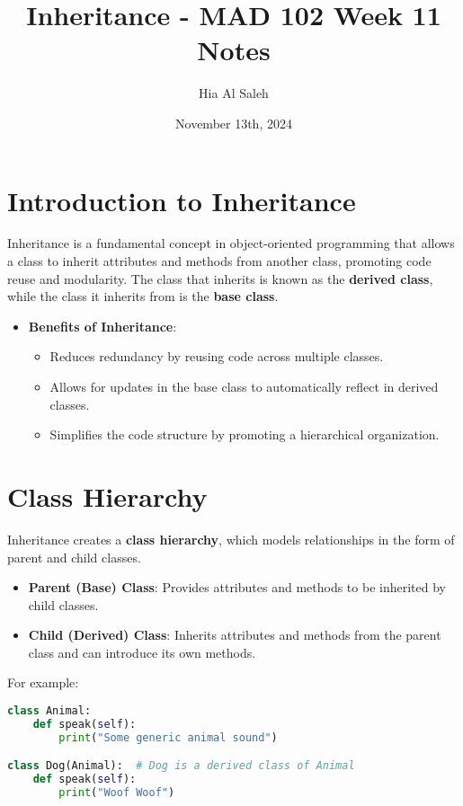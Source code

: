\documentclass{article}
\title{Inheritance - MAD 102 Week 11 Notes}
\author{Hia Al Saleh}
\date{November 13th, 2024}
\begin{document}
\maketitle
\tableofcontents
\newpage

\section{Introduction to Inheritance}
Inheritance is a fundamental concept in object-oriented programming that allows a class to inherit attributes and methods from another class, promoting code reuse and modularity. The class that inherits is known as the \textbf{derived class}, while the class it inherits from is the \textbf{base class}.

\begin{itemize}
    \item \textbf{Benefits of Inheritance}:
        \begin{itemize}
            \item Reduces redundancy by reusing code across multiple classes.
            \item Allows for updates in the base class to automatically reflect in derived classes.
            \item Simplifies the code structure by promoting a hierarchical organization.
        \end{itemize}
\end{itemize}

\section{Class Hierarchy}
Inheritance creates a \textbf{class hierarchy}, which models relationships in the form of parent and child classes.
\begin{itemize}
    \item \textbf{Parent (Base) Class}: Provides attributes and methods to be inherited by child classes.
    \item \textbf{Child (Derived) Class}: Inherits attributes and methods from the parent class and can introduce its own methods.
\end{itemize}

For example:
\begin{lstlisting}[language=Python]
class Animal:
    def speak(self):
        print("Some generic animal sound")

class Dog(Animal):  # Dog is a derived class of Animal
    def speak(self):
        print("Woof Woof")
\end{lstlisting}
\end{document}
